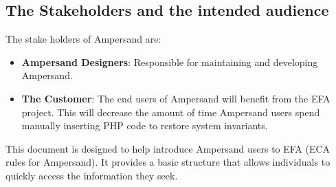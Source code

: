  \subsection{The Stakeholders and the intended audience}\label{sec:Stakeholders}
The stake holders of Ampersand are:

\begin{itemize}
	\item \textbf{Ampersand Designers}: Responsible for maintaining and developing Ampersand.
	\item \textbf{The Customer}: The end users of Ampersand
           will benefit from the EFA
          project.
          This will decrease the amount of time 
Ampersand users spend manually inserting PHP code to restore system invariants. 
\end{itemize}

This document is designed to help introduce  Ampersand users to EFA 
(ECA rules for Ampersand). It provides a basic structure that allows 
individuals to quickly access the information they seek. 
